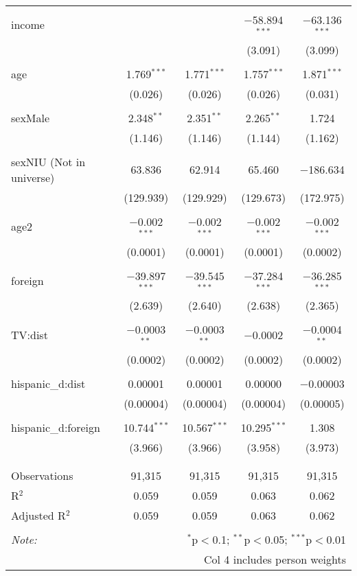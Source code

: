 \begin{table}[!htbp]
\begin{tabular}{@{\extracolsep{-5pt}}lcccc}
  & & & & \\ 
 income &  &  & $-$58.894$^{***}$ & $-$63.136$^{***}$ \\ 
  &  &  & (3.091) & (3.099) \\ 
  & & & & \\ 
 age & 1.769$^{***}$ & 1.771$^{***}$ & 1.757$^{***}$ & 1.871$^{***}$ \\ 
  & (0.026) & (0.026) & (0.026) & (0.031) \\ 
  & & & & \\ 
 sexMale & 2.348$^{**}$ & 2.351$^{**}$ & 2.265$^{**}$ & 1.724 \\ 
  & (1.146) & (1.146) & (1.144) & (1.162) \\ 
  & & & & \\ 
 sexNIU (Not in universe) & 63.836 & 62.914 & 65.460 & $-$186.634 \\ 
  & (129.939) & (129.929) & (129.673) & (172.975) \\ 
  & & & & \\ 
 age2 & $-$0.002$^{***}$ & $-$0.002$^{***}$ & $-$0.002$^{***}$ & $-$0.002$^{***}$ \\ 
  & (0.0001) & (0.0001) & (0.0001) & (0.0002) \\ 
  & & & & \\ 
 foreign & $-$39.897$^{***}$ & $-$39.545$^{***}$ & $-$37.284$^{***}$ & $-$36.285$^{***}$ \\ 
  & (2.639) & (2.640) & (2.638) & (2.365) \\ 
  & & & & \\ 
 TV:dist & $-$0.0003$^{**}$ & $-$0.0003$^{**}$ & $-$0.0002 & $-$0.0004$^{**}$ \\ 
  & (0.0002) & (0.0002) & (0.0002) & (0.0002) \\ 
  & & & & \\ 
 hispanic\_d:dist & 0.00001 & 0.00001 & 0.00000 & $-$0.00003 \\ 
  & (0.00004) & (0.00004) & (0.00004) & (0.00005) \\ 
  & & & & \\ 
 hispanic\_d:foreign & 10.744$^{***}$ & 10.567$^{***}$ & 10.295$^{***}$ & 1.308 \\ 
  & (3.966) & (3.966) & (3.958) & (3.973) \\ 
  & & & & \\ 
\hline \\[-1.8ex] 
Observations & 91,315 & 91,315 & 91,315 & 91,315 \\ 
R$^{2}$ & 0.059 & 0.059 & 0.063 & 0.062 \\ 
Adjusted R$^{2}$ & 0.059 & 0.059 & 0.063 & 0.062 \\ 
\hline 
\hline \\[-1.8ex] 
\textit{Note:}  & \multicolumn{4}{r}{$^{*}$p$<$0.1; $^{**}$p$<$0.05; $^{***}$p$<$0.01} \\ 
 & \multicolumn{4}{r}{Col 4 includes person weights} \\ 
\end{tabular} 
\end{table} 
